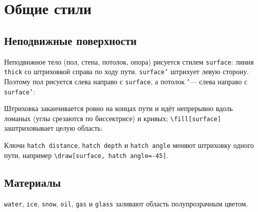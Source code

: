 \documentclass[a4paper,11pt]{article}
\newcommand\key[1]{\texttt{#1}}
\begin{document}
\section{Общие стили}

\subsection{Неподвижные поверхности}
Неподвижное тело (пол, стена, потолок, опора) рисуется стилем
\key{surface}: линия \key{thick} со штриховкой справа по ходу пути.
\key{surface'} штрихует левую сторону. Поэтому пол рисуется слева направо
с \key{surface}, а потолок "--- слева направо с \key{surface'}:
\begin{example}
\end{example}
Штриховка заканчивается ровно на концах пути и идёт непрерывно вдоль ломаных
(углы срезаются по биссектрисе) и кривых; \verb|\fill[surface]|
заштриховывает целую область:
\begin{example}
\end{example}
Ключи \key{hatch distance}, \key{hatch depth} и \key{hatch angle} меняют
штриховку одного пути, например \verb|\draw[surface, hatch angle=-45]|.

\subsection{Материалы}\label{sec:materials}
\key{water}, \key{ice}, \key{snow}, \key{oil}, \key{gas} и \key{glass}
заливают область полупрозрачным цветом.
\begin{example}
\end{example}
\begin{tcolorbox}[colback=black!3, colframe=black!30, boxrule=0.4pt, arc=1mm]
\centering
{}
\end{tcolorbox}
\end{document}
